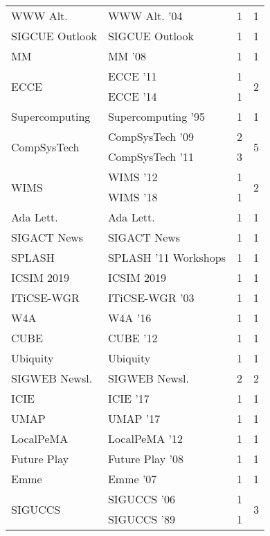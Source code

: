 \begin{table*}[t]
\begin{tabular}{llrr}
\multirow{1}{*}{WWW Alt. } & WWW Alt. '04 & 1 & \multirow{1}{*}{1}\\
\multirow{1}{*}{SIGCUE Outlook} & SIGCUE Outlook & 1 & \multirow{1}{*}{1}\\
\multirow{1}{*}{MM } & MM '08 & 1 & \multirow{1}{*}{1}\\
\multirow{2}{*}{ECCE } & ECCE '11 & 1 & \multirow{2}{*}{2}\\
& ECCE '14 & 1 &\\
\multirow{1}{*}{Supercomputing } & Supercomputing '95 & 1 & \multirow{1}{*}{1}\\
\multirow{2}{*}{CompSysTech } & CompSysTech '09 & 2 & \multirow{2}{*}{5}\\
& CompSysTech '11 & 3 &\\
\multirow{2}{*}{WIMS } & WIMS '12 & 1 & \multirow{2}{*}{2}\\
& WIMS '18 & 1 &\\
\multirow{1}{*}{Ada Lett.} & Ada Lett. & 1 & \multirow{1}{*}{1}\\
\multirow{1}{*}{SIGACT News} & SIGACT News & 1 & \multirow{1}{*}{1}\\
\multirow{1}{*}{SPLASH } & SPLASH '11 Workshops & 1 & \multirow{1}{*}{1}\\
\multirow{1}{*}{ICSIM 2019} & ICSIM 2019 & 1 & \multirow{1}{*}{1}\\
\multirow{1}{*}{ITiCSE-WGR } & ITiCSE-WGR '03 & 1 & \multirow{1}{*}{1}\\
\multirow{1}{*}{W4A } & W4A '16 & 1 & \multirow{1}{*}{1}\\
\multirow{1}{*}{CUBE } & CUBE '12 & 1 & \multirow{1}{*}{1}\\
\multirow{1}{*}{Ubiquity} & Ubiquity & 1 & \multirow{1}{*}{1}\\
\multirow{1}{*}{SIGWEB Newsl.} & SIGWEB Newsl. & 2 & \multirow{1}{*}{2}\\
\multirow{1}{*}{ICIE } & ICIE '17 & 1 & \multirow{1}{*}{1}\\
\multirow{1}{*}{UMAP } & UMAP '17 & 1 & \multirow{1}{*}{1}\\
\multirow{1}{*}{LocalPeMA } & LocalPeMA '12 & 1 & \multirow{1}{*}{1}\\
\multirow{1}{*}{Future Play } & Future Play '08 & 1 & \multirow{1}{*}{1}\\
\multirow{1}{*}{Emme } & Emme '07 & 1 & \multirow{1}{*}{1}\\
\multirow{3}{*}{SIGUCCS } & SIGUCCS '06 & 1 & \multirow{3}{*}{3}\\
& SIGUCCS '89 & 1 &\\

\end{tabular}
\end{table*}
